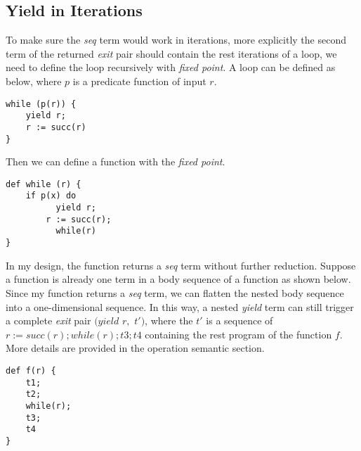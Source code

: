 \subsection{Yield in Iterations}
To make sure the \textit{seq} term would work in iterations, more explicitly the second term of the returned  \textit{exit} pair should contain the rest iterations of a loop, we need to define the loop recursively with \textit{fixed point}. A \while loop can be defined as below, where $p$ is a predicate function of input $r$.
\begin{lstlisting}[basicstyle=\small]
while (p(r)) {
	yield r; 
	r := succ(r)
}
\end{lstlisting}
Then we can define a \while function with the \textit{fixed point}.
\begin{lstlisting}[basicstyle=\small]
def while (r) {
	if p(x) do
		  yield r; 
	    r := succ(r);
		  while(r)
}
\end{lstlisting}
In my design, the \while function returns a \textit{seq} term without further reduction. Suppose a \while function is already one term in a body sequence of a function as shown below. Since my \while function returns a \textit{seq} term, we can flatten the nested body sequence into a one-dimensional sequence. In this way, a nested \textit{yield} term can still trigger a complete \textit{exit} pair $(yield$ $r,$ $t')$, where the $t'$ is a sequence of $r := succ(r); while(r); t3; t4$ containing the rest program of the function $f$. More details are provided in the operation semantic section.
\begin{lstlisting}[basicstyle=\small]
def f(r) {
	t1;
	t2;
	while(r);
	t3;
	t4
} 		
\end{lstlisting}


